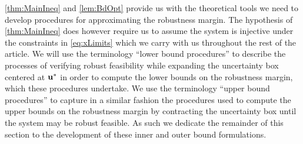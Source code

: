 \cref{thm:MainIneq} and \cref{lem:BdOpt} provide us with the theoretical tools we need to develop procedures for approximating the robustness margin.
The hypothesis of \cref{thm:MainIneq} does however require us to assume the system is injective under the constraints in \ref{eq:xLimits} which we carry with us throughout the rest of the article. 
We will use the terminology \enquote{lower bound procedures} to describe the processes of verifying robust feasibility while expanding the uncertainty box centered at $\mathbf{u}^*$ in order to compute the lower bounds on the robustness margin, which these procedures undertake. 
We use the terminology \enquote{upper bound procedures} to capture in a similar fashion the procedures used to compute the upper bounds on the robustness margin by contracting the uncertainty box until the system may be robust feasible. 
As such we dedicate the remainder of this section to the development of these inner and outer bound formulations. 
